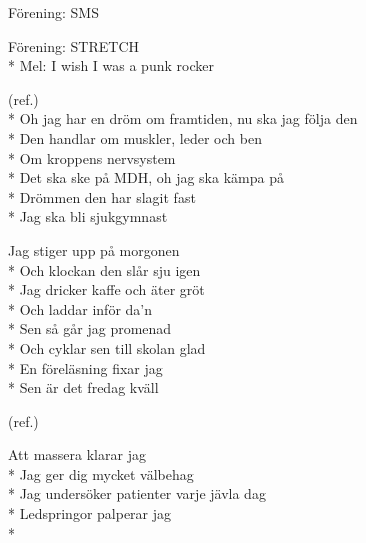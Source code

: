\begin{SongText}[???]
    \begin{SongInfo}
        Förening: SMS
    \end{SongInfo}
    \begin{SongVerse}
        [NO SONG]
    \end{SongVerse}
\end{SongText}

\begin{SongText}[Sjukgymnastlåten]
    \begin{SongInfo}
        Förening: STRETCH\\*%
        Mel:  I wish I was a punk rocker
    \end{SongInfo}
    \begin{SongVerse}
        (ref.)\\*%
        Oh jag har en dröm om framtiden, nu ska jag följa den\\*%
        Den handlar om muskler, leder och ben\\*%
        Om kroppens nervsystem\\*%
        Det ska ske på MDH, oh jag ska kämpa på\\*%
        Drömmen den har slagit fast\\*%
        Jag ska bli sjukgymnast
    \end{SongVerse}
    \begin{SongVerse}
        Jag stiger upp på morgonen\\*%
        Och klockan den slår sju igen\\*%
        Jag dricker kaffe och äter gröt\\*%
        Och laddar inför da’n\\*%
        Sen så går jag promenad\\*%
        Och cyklar sen till skolan glad\\*%
        En föreläsning fixar jag\\*%
        Sen är det fredag kväll
    \end{SongVerse}
    \begin{SongVerse}
        (ref.)
    \end{SongVerse}
    \begin{SongVerse}
        Att massera klarar jag\\*%
        Jag ger dig mycket välbehag\\*%
        Jag undersöker patienter varje jävla dag\\*%
        Ledspringor palperar jag\\*%

\end{SongVerse}
\end{SongText}
